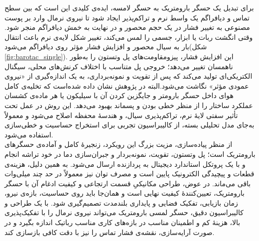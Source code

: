 برای تبدیل یک حسگر بارومتریک به حسگر لامسه، ایده‌ی کلیدی این است که بین سطح تماس و دیافراگم یک واسط نرم و تراکم‌پذیر ایجاد شود تا نیروی نرمال وارد بر پوست مصنوعی به تغییر فشار در یک حجم محصور و در نهایت به خمش دیافراگم منجر شود. وقتی انگشت ربات یا ابزار، جسمی را لمس می‌کند، تغییر شکل لایه‌ی نرم باعث انتقال بار به سیال محصور و افزایش فشار مؤثر روی دیافراگم می‌شود(شکل \ref{fig:barotac_single}). این افزایش فشار، پیزومقاومت‌های پل وتستون را به‌طور ناهمسان تغییر می‌دهد؛ خروجی پل متناسب با اختلاف کرنش‌های محلی، سیگنال الکتریکی‌ای تولید می‌کند که پس از تقویت و نمونه‌برداری، به یک اندازه‌گیری از «نیروی عمودی مؤثر» نگاشت می‌شود.البته در پژوهش \cite{tenzer_feel_2014} نشان داده شده‌است که تخلیه‌ی کامل هوای داخل حسگر بارومتر و جایگزین کردن آن با سیلیکون یا هر ماده‌ی کشسان عملکرد ساختار را از منظر خطی بودن و پسماند بهبود می‌دهد. این روش در عمل تحت تأثیر سفتی لایهٔ نرم، تراکم‌پذیری سیال، و هندسهٔ محفظه اصلاح می‌شود و معمولاً به‌جای مدل تحلیلی بسته، از کالیبراسیون تجربی برای استخراج حساسیت و خطی‌سازی استفاده می‌شود.
\\
از منظر پیاده‌سازی، مزیت بزرگ این رویکرد، زنجیرهٔ کامل و آماده‌ی حسگرهای بارومتریک است؛ پل وتستون، تقویت، نمونه‌بردار و جبران‌سازی دما در خود تراشه انجام و با یک پروتکل استاندارد دیجیتال به پردازنده ارسال می‌شود. به همین دلیل، هزینه‌ی قطعات و پیچیدگی الکترونیک پایین است و مصرف توان نیز معمولاً در حد چند میلی‌وات باقی می‌ماند. در عوض، طراحی مکانیکیِ قسمت ارتجاعی و کیفیت ادغام آن با حسگر بارومتریک، تعیین‌کنندهٔ کیفیت نهایی است و همان‌جا باید روی حساسیت، بازه‌ی نیرو، زمان بازیابی، تفکیک فضایی و پایداری بلندمدت تصمیم‌گیری شود. با یک طراحی و کالیبراسیون دقیق، حسگر لمسی بارومتریک می‌تواند نیروی نرمال را با تفکیک‌پذیری بالا، هزینهٔ کم و اطمینان مناسب در بازه‌های کاری مناسب رباتیک اندازه بگیرد و در صورت آرایه‌سازی، نقشه‌ی فشار تماس را نیز با دقت کافی بازسازی کند.

